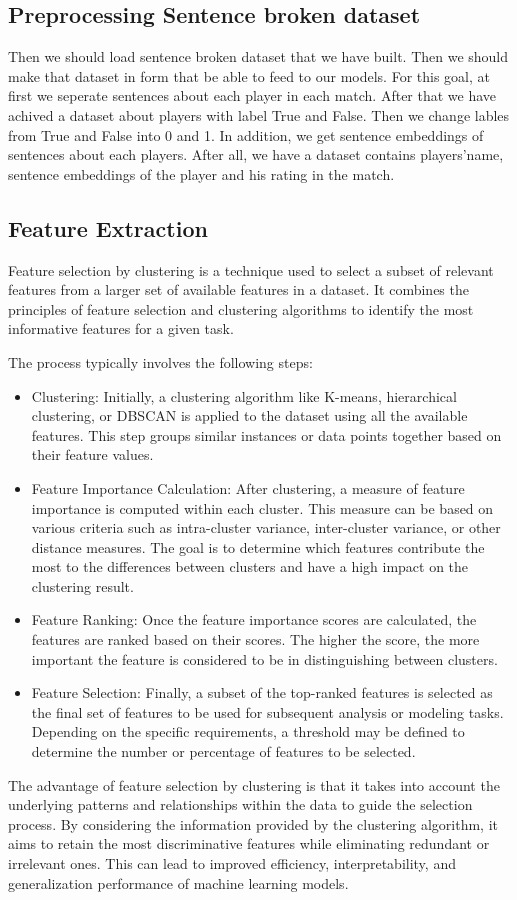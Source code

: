 \documentclass{article}
\begin{document}
\subsection{Preprocessing Sentence broken dataset}
Then we should load sentence broken dataset that we have built. Then we should make that dataset in form that be able to feed to our models.
For this goal, at first we seperate sentences about each player in each match. After that we have achived a dataset about players with label True and False.
Then we change lables from True and False into 0 and 1. In addition, we get sentence embeddings of sentences about each players.
After all, we have a dataset contains players'name, sentence embeddings of the player and his rating in the match.

\subsection{Feature Extraction}
Feature selection by clustering is a technique used to select a subset of relevant features from a larger set of available features in a dataset. It combines the principles of feature selection and clustering algorithms to identify the most informative features for a given task.

The process typically involves the following steps:
\begin{itemize}
    \item Clustering: Initially, a clustering algorithm like K-means, hierarchical clustering, or DBSCAN is applied to the dataset using all the available features. This step groups similar instances or data points together based on their feature values.
    \item Feature Importance Calculation: After clustering, a measure of feature importance is computed within each cluster. This measure can be based on various criteria such as intra-cluster variance, inter-cluster variance, or other distance measures. The goal is to determine which features contribute the most to the differences between clusters and have a high impact on the clustering result.
    \item Feature Ranking: Once the feature importance scores are calculated, the features are ranked based on their scores. The higher the score, the more important the feature is considered to be in distinguishing between clusters.
    \item Feature Selection: Finally, a subset of the top-ranked features is selected as the final set of features to be used for subsequent analysis or modeling tasks. Depending on the specific requirements, a threshold may be defined to determine the number or percentage of features to be selected.
\end{itemize}
The advantage of feature selection by clustering is that it takes into account the underlying patterns and relationships within the data to guide the selection process. By considering the information provided by the clustering algorithm, it aims to retain the most discriminative features while eliminating redundant or irrelevant ones. This can lead to improved efficiency, interpretability, and generalization performance of machine learning models.
\end{document}
